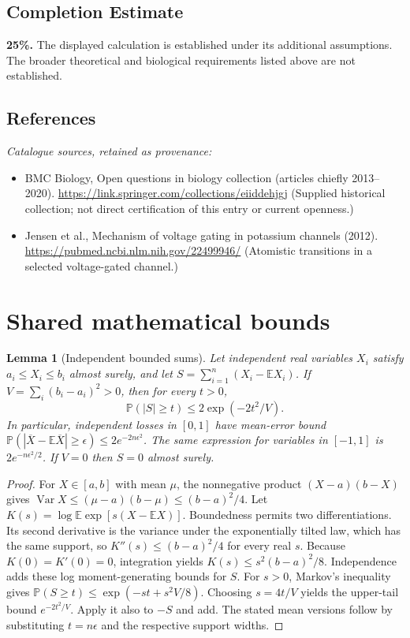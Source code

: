 \documentclass[11pt]{article}
\newcommand{\E}{\mathbb E}
\newcommand{\Prob}{\mathbb P}
\DeclareMathOperator{\Var}{Var}
\providecommand{\E}{\mathbb E}
\providecommand{\Prob}{\mathbb P}
\providecommand{\Var}{\operatorname{Var}}
\newtheorem{sharedlemma}{Lemma}[section]
\begin{document}
\subsection{Completion Estimate}
\textbf{25\%.} The displayed calculation is established under its additional assumptions. The broader theoretical and biological requirements listed above are not established.
\subsection{References}
\noindent\emph{Catalogue sources, retained as provenance:}
\begin{itemize}
\item BMC Biology, Open questions in biology collection (articles chiefly 2013--2020). \url{https://link.springer.com/collections/eiiddehjgj} (Supplied historical collection; not direct certification of this entry or current openness.)
\item Jensen et al., Mechanism of voltage gating in potassium channels (2012). \url{https://pubmed.ncbi.nlm.nih.gov/22499946/} (Atomistic transitions in a selected voltage-gated channel.)
\end{itemize}
\clearpage


\appendix
\section{Shared mathematical bounds}\label{app:bounds}
\begin{sharedlemma}[Independent bounded sums]\label{lem:bounded}
Let independent real variables $X_i$ satisfy $a_i\leq X_i\leq b_i$ almost surely,
and let $S=\sum_{i=1}^n(X_i-\E X_i)$. If
$V=\sum_i(b_i-a_i)^2>0$, then for every $t>0$,
\[
 \Prob(|S|\geq t)\leq 2\exp(-2t^2/V).
\]
In particular, independent losses in $[0,1]$ have mean-error bound
$\Prob(|\overline X-\E\overline X|\geq\epsilon)
\leq2e^{-2n\epsilon^2}$. The same expression for variables in $[-1,1]$
is $2e^{-n\epsilon^2/2}$. If $V=0$ then $S=0$ almost surely.
\end{sharedlemma}
\begin{proof}
For $X\in[a,b]$ with mean $\mu$, the nonnegative product
$(X-a)(b-X)$ gives
$\Var X\leq(\mu-a)(b-\mu)\leq(b-a)^2/4$.
Let $K(s)=\log\E\exp[s(X-\E X)]$.
Boundedness permits two differentiations. Its second derivative is the variance
under the exponentially tilted law, which has the same support, so
$K''(s)\leq(b-a)^2/4$ for every real $s$.
Because $K(0)=K'(0)=0$, integration yields
$K(s)\leq s^2(b-a)^2/8$.
Independence adds these log moment-generating bounds for $S$.
For $s>0$, Markov's inequality gives
$\Prob(S\geq t)\leq\exp(-st+s^2V/8)$.
Choosing $s=4t/V$ yields the upper-tail bound $e^{-2t^2/V}$.
Apply it also to $-S$ and add. The stated mean versions follow by substituting
$t=n\epsilon$ and the respective support widths.
\end{proof}
\end{document}
